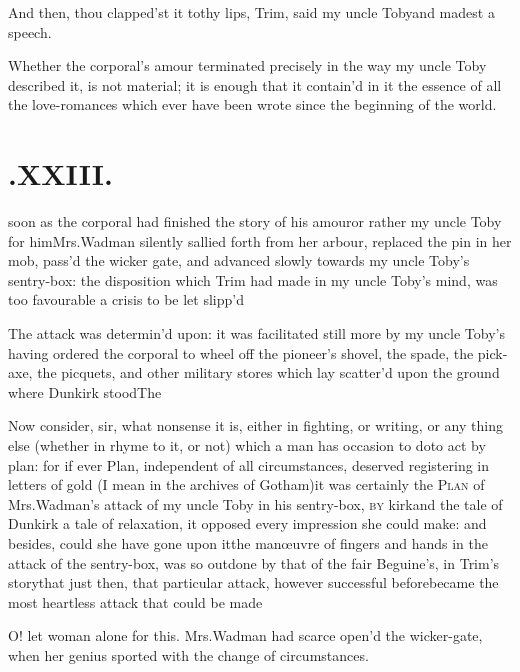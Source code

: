 \documentclass[twoside]{article}
\begin{document}
\tsh And then, thou clapped’st it to\break thy lips,
Trim, said my uncle Toby\tsh\break and madest a
speech.

Whether the corporal’s amour terminated precisely in the
way my uncle Toby described it, is not material; it is
enough that it contain'd in it the essence of all the love-romances
which ever have been wrote since the beginning of the world.

\vfill{}\eject\null
\section{.\enspace XXIII.}

 soon as the corporal had finished\break
the story of his amour\tsh or rather my uncle Toby for
him\tsk Mrs.\break Wadman silently sallied forth from her
arbour, replaced the pin in her mob, pass’d the wicker gate,
and advanced slowly towards my uncle Toby’s
sentry-box: the disposition which Trim had made in my uncle
Toby’s mind, was too favourable a crisis to be let
slipp’d\tsh

\tsh The attack was determin’d upon: it was facilitated still more by my uncle
Toby’s having ordered the corporal to wheel off the pioneer’s shovel, the spade, the
pick-axe, the picquets, and other military stores which lay scatter’d upon the
ground where Dunkirk stood\tsk The 

Now consider, sir, what nonsense it is, either in fighting, or
writing, or any thing else (whether in rhyme to it, or not) which a
man has occasion to do\tsk\break to act by plan: for if ever Plan,
independent of all circumstances, deserved registering in letters
of gold (I mean in the archives of Gotham)\tsk it was
certainly the \textsc{Plan} of Mrs.\@ Wadman’s
attack of my uncle Toby in his sentry-box, \textsc{by}
kirk\tsk and the tale
of Dunkirk a tale of relaxation, it opposed every impression
she could make: and besides, could she have gone upon it\tsk the
manœuvre of fingers and hands in the attack of the
sentry-box, was so outdone by that of the fair Beguine’s, in Trim’s
story\tsk that just then, that particular attack, however
successful before\tsk became the most heartless attack that could
be made\tsh

O! let woman alone for this. Mrs.\@ Wadman had scarce
open’d the wicker-gate, when her genius sported with the
change of circumstances.
\end{document}
